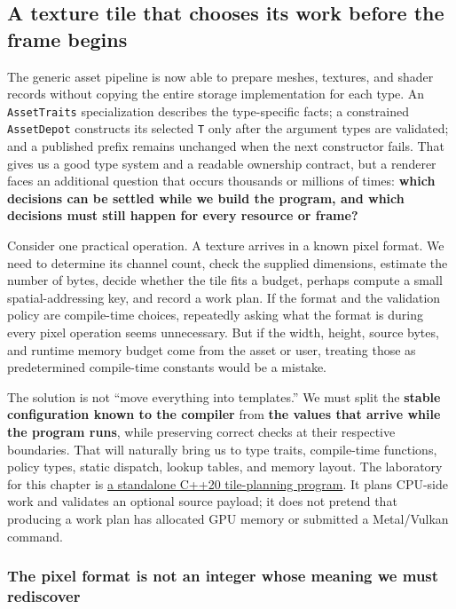 \subsection{A texture tile that chooses its work before the frame begins}\label{a-texture-tile-that-chooses-its-work-before-the-frame-begins}

The generic asset pipeline is now able to prepare meshes, textures, and shader records without copying the entire storage implementation for each type. An \texttt{AssetTraits} specialization describes the type-specific facts; a constrained \texttt{AssetDepot} constructs its selected \texttt{T} only after the argument types are validated; and a published prefix remains unchanged when the next constructor fails. That gives us a good type system and a readable ownership contract, but a renderer faces an additional question that occurs thousands or millions of times: \textbf{which decisions can be settled while we build the program, and which decisions must still happen for every resource or frame?}

Consider one practical operation. A texture arrives in a known pixel format. We need to determine its channel count, check the supplied dimensions, estimate the number of bytes, decide whether the tile fits a budget, perhaps compute a small spatial-addressing key, and record a work plan. If the format and the validation policy are compile-time choices, repeatedly asking what the format is during every pixel operation seems unnecessary. But if the width, height, source bytes, and runtime memory budget come from the asset or user, treating those as predetermined compile-time constants would be a mistake.

The solution is not ``move everything into templates.'' We must split the \textbf{stable configuration known to the compiler} from \textbf{the values that arrive while the program runs}, while preserving correct checks at their respective boundaries. That will naturally bring us to type traits, compile-time functions, policy types, static dispatch, lookup tables, and memory layout. The laboratory for this chapter is \href{tools/labs/compile_time_asset_policy_lab.cpp}{a standalone C++20 tile-planning program}. It plans CPU-side work and validates an optional source payload; it does not pretend that producing a work plan has allocated GPU memory or submitted a Metal/Vulkan command.

\subsubsection{The pixel format is not an integer whose meaning we must rediscover}\label{the-pixel-format-is-not-an-integer-whose-meaning-we-must-rediscover}

